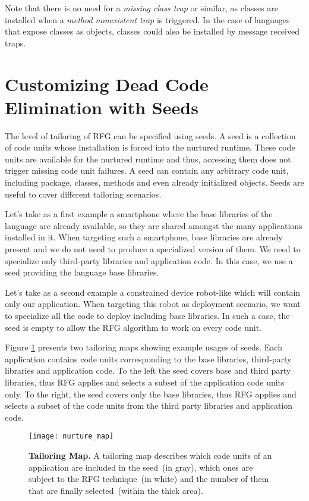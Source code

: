 Note that there is no need for a \emph{missing class trap} or similar, as classes are installed when a \emph{method nonexistent trap} is triggered. In the case of languages that expose classes as objects, classes could also be installed by message received traps.


\section{Customizing Dead Code Elimination with Seeds}\label{sec:seeds}

The level of tailoring of RFG can be specified using seeds. A seed is a collection of code units whose installation is forced into the nurtured runtime. These code units are available for the nurtured runtime and thus, accessing them does not trigger missing code unit failures. A seed can contain any arbitrary code unit, including package, classes, methods and even already initialized objects. Seeds are useful to cover different tailoring scenarios.

Let's take as a first example a smartphone where the base libraries of the language are already available, so they are shared amongst the many applications installed in it. When targeting such a smartphone, base libraries are already present and we do not need to produce a specialized version of them. We need to specialize only third-party libraries and application code. In this case, we use a seed providing the language base libraries.

Let's take as a second example a constrained device robot-like which will contain only our application. When targeting this robot as deployment scenario, we want to specialize all the code to deploy including base libraries. In such a case, the seed is empty to allow the RFG algorithm to work on every code unit.

Figure \ref{fig:nurturing_map_model} presents two tailoring maps showing example usages of seeds. Each application contains code units corresponding to the base libraries, third-party libraries and application code. To the left the seed covers base and third party libraries, thus RFG applies and selects a subset of the application code units only. To the right, the seed covers only the base libraries, thus RFG applies and selects a subset of the code units from the third party libraries and application code.

\begin{figure}[ht]
\begin{center}
\texttt{[image: nurture\_map]}
\caption{\textbf{Tailoring Map.} A tailoring map describes which code units of an application are included in the seed~(in gray), which ones are subject to the RFG technique~(in white) and the number of them that are finally selected~(within the thick area).
\label{fig:nurturing_map_model}}
\end{center}
\end{figure}


